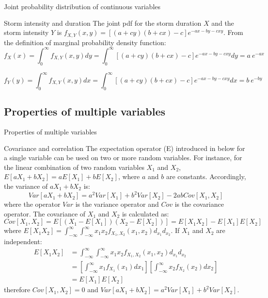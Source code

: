 \documentclass[8pt]{beamer}
\renewcommand{\emph}[1]{\textcolor{myorange}{#1}}
\begin{document}
\begin{frame}{Joint probability distribution of continuous variables}
    \begin{exampleblock}{Storm intensity and duration}
        The joint \emph{pdf} for the storm duration $X$ and the storm intensity $Y$ is $f_{X,Y} (x,y) = \left[ (a+cy)(b+cx)-c \right]e^{-ax-by-cxy}$. From the definition of marginal probability density function:
\[
            \displaystyle
            f_X (x) =  \int_{0}^{\infty} f_{X,Y} (x,y) dy = \int_{0}^{\infty} \left[ (a+cy)(b+cx)-c \right]e^{-ax-by-cxy} dy  = a \ e^{-ax}
        \]

\[
            \displaystyle
            f_Y (y) =  \int_{0}^{\infty} f_{X,Y} (x,y) dx = \int_{0}^{\infty} \left[ (a+cy)(b+cx)-c \right]e^{-ax-by-cxy} dx = b \ e^{-by}
        \]

    \end{exampleblock}
\end{frame}

\subsection{Properties of multiple variables} %

\begin{frame}{Properties of multiple variables}

    \begin{block}{Covariance and correlation}
        The \emph{expectation operator (E)} introduced in below for a single variable can be used on two or more random variables. For instance, for the linear combination of two random variables $X_1$ and $X_2$, $E[a X_1 + b X_2 ] = aE[X_1 ]+bE[X_2 ]$, where $a$ and $b$ are constants. Accordingly, the variance of $aX_1 + bX_2$ is:
        \[
            Var[aX_1 + bX_2] = a^2 Var[X_1] + b^2 Var[X_2]- 2ab Cov[X_1 , X_2]
        \]
        where the operator $Var$ is the variance operator and $Cov$ is the \alert{covariance} operator. The \alert{covariance} of $X_1$ and $X_2$ is calculated as:
        \[
            Cov[X_1 , X_2 ] = E[(X_1 - E[X_1]) (X_2 - E[X_2])] = E[X_1 X_2]-E[X_1] E[X_2] 
        \]
        where $ E[X_1 X_2] = \int_{-\infty}^{\infty} \int_{-\infty}^{\infty} x_1 x_2 f_{X_1 , X_2} (x_1, x_2) d_{x_1} d_{x_2}$. If $X_1$ and $X_2$ are independent:
         \begin{align*}
             E[X_1 X_2] &= \int_{-\infty}^{\infty} \int_{-\infty}^{\infty} x_1 x_2 f_{X_1 , X_2} (x_1, x_2) d_{x_1} d_{x_2} \\
                        &=\left[ \int_{-\infty}^{\infty} x_1 f_{X_1} (x_1) dx_1 \right]\left[ \int_{-\infty}^{\infty} x_2 f_{X_2} (x_2) dx_2 \right] \\
                        &= E[X_1] E[X_2]
        \end{align*}
        therefore $Cov[X_1 , X_2 ] = 0$ and $Var[aX_1 + bX_2] = a^2 Var[X_1] + b^2 Var[X_2]$. 
    \end{block}

\end{frame}
\end{document}
